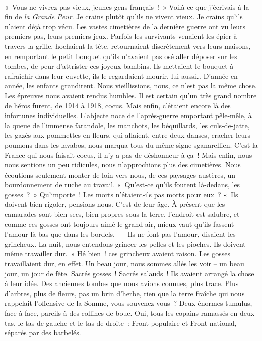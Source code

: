 \documentclass[french,twoside]{book} %
\begin{document}
\noindent  \par
« Vous ne vivrez pas vieux, jeunes gens français ! » Voilà ce que j’écrivais à la fin de \emph{la Grande Peur}. Je crains plutôt qu’ils ne vivent vieux. Je crains qu’ils n’aient déjà trop vécu. Les vastes cimetières de la dernière guerre ont vu leurs premiers pas, leurs premiers jeux. Parfois les survivants venaient les épier à travers la grille, hochaient la tête, retournaient discrètement vers leurs maisons, en remportant le petit bouquet qu’ils n’avaient pas osé aller déposer sur les tombes, de peur d’attrister ces joyeux bambins. Ils mettaient le bouquet à rafraîchir dans leur cuvette, ils le regardaient mourir, lui aussi… D’année en année, les enfants grandirent. Nous vieillissions, nous, ce n’est pas la même chose. Les épreuves nous avaient rendus humbles. Il est certain qu’un très grand nombre de héros furent, de 1914 à 1918, cocus. Mais enfin, c’étaient encore là des infortunes individuelles. L’abjecte noce de l’après-guerre emportant pêle-mêle, à la queue de l’immense farandole, les manchots, les béquillards, les culs-de-jatte, les gazés aux pommettes en fleurs, qui allaient, entre deux danses, cracher leurs poumons dans les lavabos, nous marqua tous du même signe sganarellien. C’est la France qui nous faisait cocus, il n’y a pas de déshonneur à ça ! Mais enfin, nous nous sentions un peu ridicules, nous n’approchions plus des cimetières. Nous écoutions seulement monter de loin vers nous, de ces paysages austères, un bourdonnement de ruche au travail. « Qu’est-ce qu’ils foutent là-dedans, les gosses ? » Qu’importe ! Les morts n’étaient-ils pas morts pour eux ? « Ils doivent bien rigoler, pensions-nous. C’est de leur âge. À présent que les camarades sont bien secs, bien propres sous la terre, l’endroit est salubre, et comme ces gosses ont toujours aimé le grand air, mieux vaut qu’ils fassent l’amour là-bas que dans les bordels. — Ils ne font pas l’amour, disaient les grincheux. La nuit, nous entendons grincer les pelles et les pioches. Ils doivent même travailler dur. » Hé bien ! ces grincheux avaient raison. Les gosses travaillaient dur, en effet. Un beau jour, nous sommes allés les voir – un beau jour, un jour de fête. Sacrés gosses ! Sacrés salauds ! Ils avaient arrangé la chose à leur idée. Des anciennes tombes que nous avions connues, plus trace. Plus d’arbres, plus de fleurs, pas un brin d’herbe, rien que la terre fraîche qui nous rappelait l’offensive de la Somme, vous souvenez-vous ? Deux énormes tumulus, face à face, pareils à des collines de boue. Oui, tous les copains ramassés en deux tas, le tas de gauche et le tas de droite : Front populaire et Front national, séparés par des barbelés.\par
 \par
\end{document}
